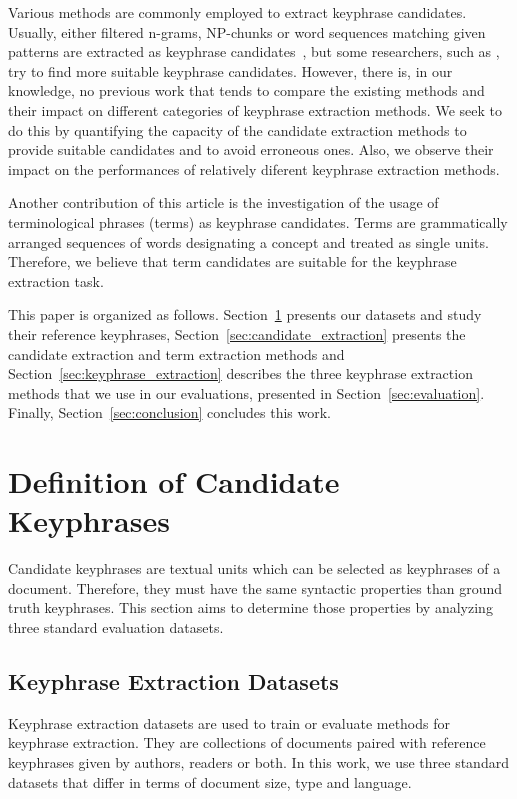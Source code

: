   Various methods are commonly employed to extract keyphrase candidates.
  Usually, either filtered n-grams, NP-chunks or word sequences matching given
  patterns are extracted as keyphrase
  candidates~\cite{hulth2003keywordextraction}, but some researchers, such as
  , try to find more
  suitable keyphrase candidates. However, there is, in our knowledge, no
  previous work that tends to compare the existing methods and their impact on
  different categories of keyphrase extraction methods. We seek to do this by
  quantifying the capacity of the candidate extraction methods to provide
  suitable candidates and to avoid erroneous ones. Also, we observe their impact
  on the performances of relatively diferent keyphrase extraction methods.

  Another contribution of this article is the investigation of the usage of
  terminological phrases (terms) as keyphrase candidates. Terms are
  grammatically arranged sequences of words designating a concept and treated as
  single units. Therefore, we believe that term candidates are suitable for the
  keyphrase extraction task.

  This paper is organized as follows.
  Section~\ref{sec:definition_of_candidate_keyphrases} presents our datasets and
  study their reference keyphrases, Section~\ref{sec:candidate_extraction}
  presents the candidate extraction and term extraction methods and
  Section~\ref{sec:keyphrase_extraction} describes the three keyphrase
  extraction methods that we use in our evaluations, presented in
  Section~\ref{sec:evaluation}. Finally,
  Section~\ref{sec:conclusion} concludes this work.

\section{Definition of Candidate Keyphrases}
\label{sec:definition_of_candidate_keyphrases}
  Candidate keyphrases are textual units which can be selected as keyphrases
  of a document. Therefore, they must have the same syntactic properties than
  ground truth keyphrases. This section aims to determine those properties by
  analyzing three standard evaluation datasets.

  \subsection{Keyphrase Extraction Datasets}
  \label{subsec:keyphrase_extraction_datasets}
    Keyphrase extraction datasets are used to train or evaluate methods for
    keyphrase extraction. They are collections of documents paired with
    reference keyphrases given by authors, readers or both. In this work, we use
    three standard datasets that differ in terms of document size,  type and
    language.

